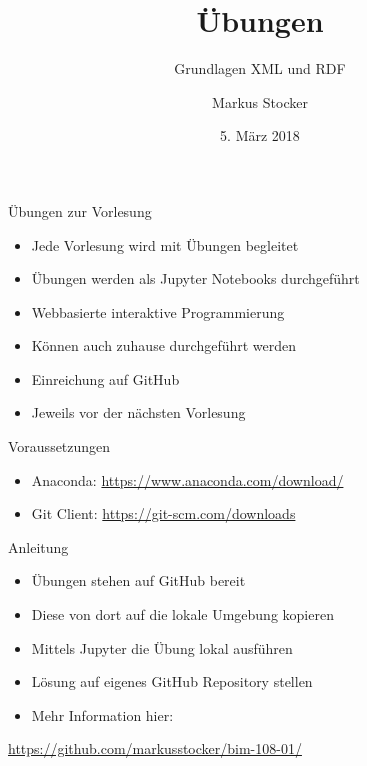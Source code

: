 \documentclass{beamer}
\title{Übungen}
\subtitle{Grundlagen XML und RDF}
\author{Markus Stocker}
\date{5. März 2018}
\begin{document}
\maketitle

\begin{frame}{Übungen zur Vorlesung}
  
  \begin{itemize}
  	\item Jede Vorlesung wird mit Übungen begleitet
  	\item Übungen werden als Jupyter Notebooks durchgeführt
  	\item Webbasierte interaktive Programmierung
  	\item Können auch zuhause durchgeführt werden
	\item Einreichung auf GitHub
	\item Jeweils vor der nächsten Vorlesung
  \end{itemize}
  
\end{frame}

\begin{frame}{Voraussetzungen}
	
	\begin{itemize}
		\item Anaconda: \url{https://www.anaconda.com/download/}
		\item Git Client: \url{https://git-scm.com/downloads}
	\end{itemize}
	
\end{frame}

\begin{frame}[fragile]{Anleitung}
	
	\begin{itemize}
		\item Übungen stehen auf GitHub bereit
		\item Diese von dort auf die lokale Umgebung kopieren
		\item Mittels Jupyter die Übung lokal ausführen
		\item Lösung auf eigenes GitHub Repository stellen
		\item Mehr Information hier:
	\end{itemize}
	
	\vspace{0.5cm}
	\Large\centering
  \url{https://github.com/markusstocker/bim-108-01/}
	
\end{frame}
\end{document}
